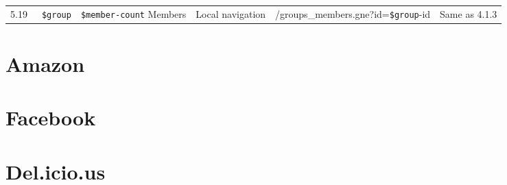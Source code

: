 \documentclass[12pt,a4paper]{article}
\newcommand{\var}[1]{\texttt{\${#1}}}
\begin{document}
\begin{landscape}
\begin{table}[h!b!p!]
\begin{center}
\begin{tiny}
\begin{tabular}{r|l|l|l|l|p{3cm}}
              5.19 &
              ~\var{group}  &
              \var{member-count} Members &
              Local navigation &
              /groups\_members.gne?id=\var{group}-id &
              Same as 4.1.3 \\

          \end{tabular}
        \rm
      \end{tiny}
    \end{center}
  \end{table}
\end{landscape}

\section{Amazon}

\section{Facebook}

\section{Del.icio.us}
\end{document}
